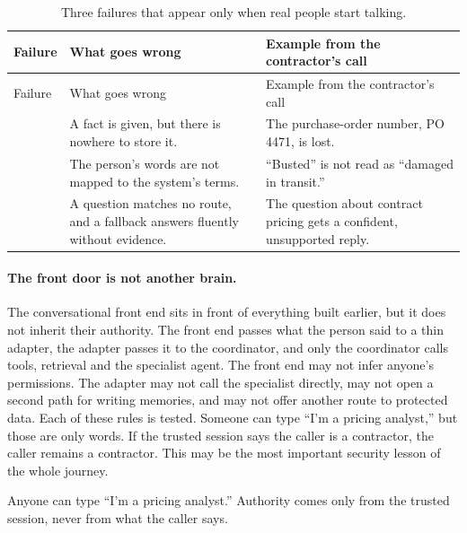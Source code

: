\begingroup
\small
\begin{xltabular}{\textwidth}{@{}>{\raggedright\arraybackslash}p{2.2cm}>{\raggedright\arraybackslash}X>{\raggedright\arraybackslash}X@{}}
\caption{Three failures that appear only when real people start talking.}\label{tab:journey-failures}\\
\toprule
{} Failure & What goes wrong & Example from the contractor's call \\
\midrule
\endfirsthead
\toprule
{} Failure & What goes wrong & Example from the contractor's call \\
\midrule
\endhead
{} & A fact is given, but there is nowhere to store it. & The purchase-order number, PO 4471, is lost. \\
 & The person's words are not mapped to the system's terms. & ``Busted'' is not read as ``damaged in transit.'' \\
 & A question matches no route, and a fallback answers fluently without evidence. & The question about contract pricing gets a confident, unsupported reply. \\
\bottomrule
\end{xltabular}
\endgroup

\paragraph{The front door is not another brain.} The conversational front end sits in front of everything built earlier, but it does not inherit their authority. The front end passes what the person said to a thin adapter, the adapter passes it to the coordinator, and only the coordinator calls tools, retrieval and the specialist agent. The front end may not infer anyone's permissions. The adapter may not call the specialist directly, may not open a second path for writing memories, and may not offer another route to protected data. Each of these rules is tested. Someone can type ``I'm a pricing analyst,'' but those are only words. If the trusted session says the caller is a contractor, the caller remains a contractor. This may be the most important security lesson of the whole journey.

\begin{watchout}
Anyone can type ``I'm a pricing analyst.'' Authority comes only from the trusted session, never from what the caller says.
\end{watchout}


